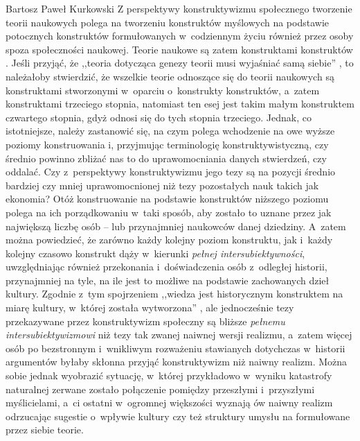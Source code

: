 \begin{artplenv}{Bartosz Paweł Kurkowski}
Z perspektywy konstruktywizmu społecznego tworzenie teorii naukowych polega na tworzeniu konstruktów myślowych na
podstawie potocznych konstruktów formułowanych w~codziennym życiu również przez osoby spoza społeczności naukowej.
Teorie naukowe są zatem konstruktami konstruktów
\parencites{schutz_potoczna_1984}[zob.][s.~34]{zboron_teorie_2009}.
Jeśli przyjąć, że ,,teoria dotycząca genezy teorii musi wyjaśniać samą siebie''
\parencite[s.~17]{leszczynski_poszukiwanie_2016},
to należałoby stwierdzić, że wszelkie teorie odnoszące się do teorii naukowych są konstruktami
stworzonymi w~oparciu o~konstrukty konstruktów, a~zatem konstruktami trzeciego stopnia, natomiast ten esej jest takim
małym konstruktem czwartego stopnia, gdyż odnosi się do tych stopnia trzeciego. Jednak, co istotniejsze, należy
zastanowić się, na czym polega wchodzenie na owe wyższe poziomy konstruowania i, przyjmując terminologię
konstruktywistyczną, czy średnio powinno zbliżać nas to do uprawomocniania danych stwierdzeń, czy oddalać.
Czy z~perspektywy konstruktywizmu jego tezy są na pozycji średnio bardziej czy mniej uprawomocnionej niż tezy pozostałych
nauk takich jak ekonomia? Otóż konstruowanie na podstawie konstruktów niższego poziomu polega na ich
porządkowaniu w~taki sposób, aby zostało to uznane przez jak największą liczbę osób -- lub przynajmniej naukowców danej
dziedziny. A~zatem można powiedzieć, że zarówno każdy kolejny poziom konstruktu, jak i~każdy kolejny czasowo konstrukt
dąży w~kierunki \textit{pełnej intersubiektywności}, uwzględniając również przekonania i~doświadczenia osób z~odległej
historii, przynajmniej na tyle, na ile jest to możliwe na podstawie zachowanych dzieł kultury. Zgodnie z~tym
spojrzeniem ,,wiedza jest historycznym konstruktem na miarę kultury, w~której została wytworzona''
\parencite[s.~29]{zboron_teorie_2009},
ale jednocześnie tezy przekazywane przez konstruktywizm społeczny są
bliższe \textit{pełnemu intersubiektywizmowi} niż tezy tak zwanej naiwnej wersji realizmu, a~zatem więcej osób po
bezstronnym i~wnikliwym rozważeniu stawianych dotychczas w~historii argumentów byłaby skłonna przyjąć konstruktywizm
niż naiwny realizm. Można sobie jednak wyobrazić sytuację, w~której przykładowo w~wyniku katastrofy naturalnej zerwane
zostało połączenie pomiędzy przeszłymi i~przyszłymi myślicielami, a~ci ostatni w~ogromnej większości wyznają ów naiwny
realizm odrzucając sugestie o~wpływie kultury czy też struktury umysłu na formułowane przez siebie teorie.

\end{artplenv}
